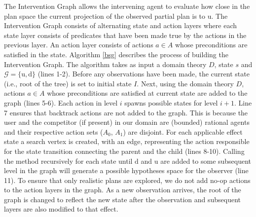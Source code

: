 \documentclass[letterpaper]{article}
\theoremstyle{plain}
\begin{document}
The Intervention Graph allows the intervening agent to evaluate how close in the plan space the current projection of the observed partial plan is to $\mathrm{u}$. The Intervention Graph consists of alternating state and action layers where each state layer consists of predicates that have been made true by the actions in the previous layer. An action layer consists of actions $a\in A$ whose preconditions are satisfied in the state. Algorithm \ref{bsg} describes the process of building the Intervention Graph. The algorithm takes as input a domain theory $D$, state $s$ and $\mathcal{G}=\lbrace\mathrm{u},\mathrm{d}\rbrace$ (lines 1-2). Before any observations have been made, the current state (i.e., root of the tree) is set to initial state $I$. Next, using the domain theory $D$, actions  $a\in A$ whose preconditions are satisfied at current state are added to the graph (lines 5-6). Each action in level $i$ spawns possible states for level $i+1$. Line 7 ensures that backtrack actions are not added to the graph. This is because the user and the competitor (if present) in our domain are (bounded) rational agents and their respective action sets ($A_0$, $A_1$) are disjoint. For each applicable effect state a search vertex is created, with an edge, representing the action responsible for the state transition connecting the parent and the child (lines 8-10). Calling the method recursively for each state until $\mathrm{d}$ and $\mathrm{u}$ are added to some subsequent level in the graph will generate a possible hypotheses space for the observer (line 11). To ensure that only realistic plans are explored, we do not add no-op actions to the action layers in the graph. As a new observation arrives, the root of the graph is changed to reflect the new state after the observation and subsequent layers are also modified to that effect.  
\end{document}
